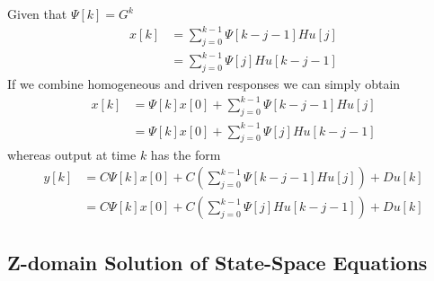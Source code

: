 \documentclass[twoside]{article}
\begin{document}
%
Given that $\Psi[k] = G^k$
%
\begin{align*}
    x[k] &= \sum\limits_{j = 0}^{k-1} \Psi[k-j-1] H u[j]
\\
&= \sum\limits_{j = 0}^{k-1} \Psi[j] H u[k-j-1]
\end{align*}
%
If we combine homogeneous and driven responses we can simply obtain
%
\begin{align*}
    x[k] &= \Psi[k] x[0] + \sum\limits_{j = 0}^{k-1} \Psi[k-j-1] H u[j]
\\
&= \Psi[k] x[0] + \sum\limits_{j = 0}^{k-1} \Psi[j] H u[k-j-1]
\end{align*}
% 
whereas output at time $k$ has the form
%
\begin{align*}
    y[k] &= C \Psi[k] x[0] + C \left( \sum\limits_{j = 0}^{k-1}
           \Psi[k-j-1] H u[j] \right) + D u[k]
\\
&= C \Psi[k] x[0] + C \left( \sum\limits_{j = 0}^{k-1} \Psi[j] H
  u[k-j-1] \right) +  D u[k]
\end{align*}
% 

\subsection*{Z-domain Solution of State-Space Equations}
\end{document}
